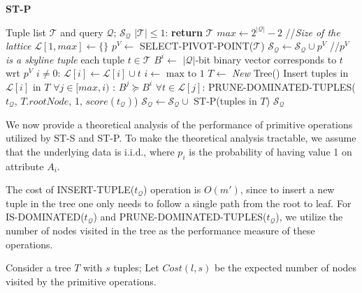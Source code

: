 \begin{algorithm}[htb]
\caption{{\bf ST-P}}
\begin{algorithmic}[1]
\label{alg:st-p}
 Tuple list $\mathcal{T}$ and query $\mathcal{Q}$;  $\mathcal{S}_\mathcal{Q}$
 $|\mathcal{T}| \leq 1$: {\bf return} $\mathcal{T}$
\STATE $max \leftarrow 2^{|\mathcal{Q}|} - 2$ //\textit{Size of the lattice}
\STATE $\mathcal{L}[1, max] \leftarrow \{\}$ 
\STATE $p^V \leftarrow$ SELECT-PIVOT-POINT($\mathcal{T}$)
\STATE $\mathcal{S_\mathcal{Q}} \leftarrow \mathcal{S_\mathcal{Q}} \cup p^V$ //\textit{$p^V$ is a skyline tuple}
 each tuple $t \in \mathcal{T}$
    \STATE \hindent $B^i \leftarrow$ $|\mathcal{Q}|$-bit binary vector corresponds to
    $t$ wrt $p^V$
    \STATE {} $i \neq 0$: $\mathcal{L}[i] \leftarrow \mathcal{L}[i] \cup t$
 $i \leftarrow \text{ max to } 1$
    \STATE \hindent $T \leftarrow$ {\it New} Tree()
    \STATE \hindent Insert tuples in $\mathcal{L}[i]$ in $T$
    \STATE {} $\forall j \in [max, i)$ : $B^j \succeq B^i$
        \STATE {} $\forall t \in \mathcal{L}[j]$: PRUNE-DOMINATED-TUPLES($t_{\mathcal{Q}}$, $T.rootNode$, 1, $score(t_{\mathcal{Q}})$)
    \STATE \hindent $\mathcal{S_\mathcal{Q}} \leftarrow \mathcal{S_\mathcal{Q}} \cup $ ST-P(tuples in $T$)
 $\mathcal{S_{\mathcal{Q}}}$
\end{algorithmic}
\end{algorithm}


\vspace{1mm}
 We now provide a theoretical analysis of the performance of primitive operations utilized by ST-S and ST-P. To make the theoretical analysis tractable, we assume that the
underlying data is i.i.d., where $p_i$ is the probability of having value 1 on attribute $A_i$.

The cost of INSERT-TUPLE($t_\mathcal{Q}$) operation is $O(m')$, since to insert a new tuple in the tree one only needs to follow a single path from the root to leaf. For IS-DOMINATED($t_\mathcal{Q}$) and PRUNE-DOMINATED-TUPLES($t_\mathcal{Q}$), we utilize the number of nodes visited in the tree as the performance measure of these operations.

Consider a tree $T$ with $s$ tuples;  Let $Cost(l, s)$ be the expected number of nodes visited by the primitive operations.


